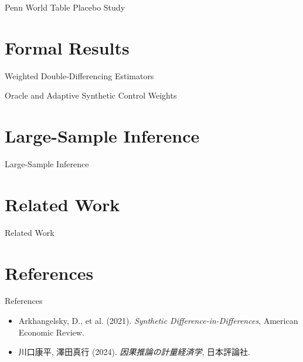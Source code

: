 \documentclass[xcolor=svgnames,aspectratio=169]{beamer}
\begin{document}
\begin{frame}{Penn World Table Placebo Study}
\end{frame}

\section{Formal Results}
\begin{frame}{Weighted Double-Differencing Estimators}
\end{frame}

\begin{frame}{Oracle and Adaptive Synthetic Control Weights}
\end{frame}

\section{Large-Sample Inference}
\begin{frame}{Large-Sample Inference}
\end{frame}

\section{Related Work}
\begin{frame}{Related Work}
\end{frame}

\section{References}
\begin{frame}{References}
\begin{itemize}
\item Arkhangelsky, D., et al. (2021). 
\textit{Synthetic Difference-in-Differences}, American Economic Review.
\item 川口康平, 澤田真行 (2024). 
\textit{因果推論の計量経済学}, 日本評論社.
\end{itemize}
\end{frame}
\end{document}
